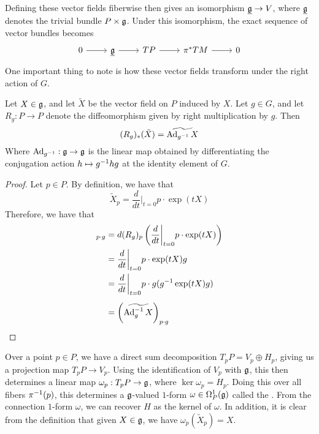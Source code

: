Defining these vector fields fiberwise  then gives an isomorphism $
\underline{\mathfrak{g}} \to V$, where $\underline{\mathfrak{g}}$ denotes the trivial bundle
$P \times \mathfrak{g}$. Under this isomorphism, the exact sequence of vector bundles becomes
\[\begin{tikzcd}
0 \ar[r] & \underline{\g} \ar[r] & TP \ar[r] & \pi^*TM \ar[r] & 0
\end{tikzcd}\]
One important thing to note is how these vector fields transform under the
right action of $G$.
%
\begin{prop}
Let $X \in \mathfrak{g}$, and let $\tilde{X}$ be the vector field on $P$ induced by
$X$. Let $g \in G$, and let $R_g : P \to P$ denote the diffeomorphism given
by right multiplication by $g$. Then
\[
(R_g)_*(\tilde{X}) = \widetilde{\operatorname{Ad}_{g^{-1}} X}
\]
Where $\operatorname{Ad}_{g^{-1}} : \mathfrak{g} \to \mathfrak{g}$ is the linear map obtained by differentiating the
conjugation action $h \mapsto g^{-1} h g$ at the identity element of $G$.
\end{prop}
%
\begin{proof}
Let $p \in P$. By definition, we have that
\[
\tilde{X}_p = \frac{d}{dt}\bigg\vert_{t=0} p \cdot \exp(tX)
\]
Therefore, we have that
\begin{align*}
[(R_g)_*(\tilde{X})]_{p\cdot g} &=
d(R_g)_p\left( \frac{d}{dt}\bigg\vert_{t = 0} p\cdot \exp(tX) \right) \\
&= \frac{d}{dt}\bigg\vert_{t = 0} p \cdot \exp(tX)g \\
&= \frac{d}{dt}\bigg\vert_{t = 0}p \cdot g (g\inv \exp(tX)g) \\[5pt]
&= \left( \widetilde{\Ad_g\inv X} \right)_{p \cdot g}
\end{align*}
\end{proof}
%
Over a point $p \in P$, we have a direct sum decomposition $T_pP = V_p \oplus H_p$,
giving us a projection map $T_pP \to V_p$. Using the identification of $V_p$
with $\mathfrak{g}$, this then determines a linear map $ \omega_p : T_pP \to \mathfrak{g}$, where
$\ker\omega_p = H_p$. Doing this over all fibers $\pi^{-1}(p)$, this determines
a $\mathfrak{g}$-valued $1$-form $\omega \in \Omega^1_P(\mathfrak{g})$ called the
. From the connection $1$-form $\omega$, we can recover
$H$ as the kernel of $\omega$. In addition, it is clear from the definition that
given $X \in \mathfrak{g}$, we have $\omega_p(\tilde{X}_p) = X$. \\

